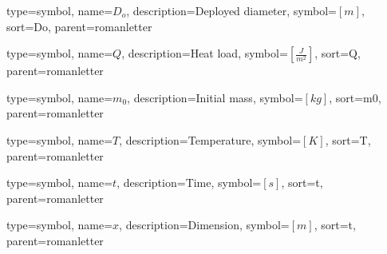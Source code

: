 {
type=symbol, %
name={\ensuremath{D_o}}, %
description={Deployed diameter}, %
symbol={$\left[m \right]$}, %
sort=Do, %
parent=romanletter %
}

{
type=symbol, %
name={\ensuremath{Q}}, %
description={Heat load}, %
symbol={$\left[\frac{J}{m^2} \right]$}, %
sort=Q, %
parent=romanletter %
}

{
type=symbol, %
name={\ensuremath{m_0}}, %
description={Initial mass}, %
symbol={$\left[kg \right]$}, %
sort=m0, %
parent=romanletter %
}


{
	type=symbol, %
	name={\ensuremath{T}}, %
	description={Temperature}, %
	symbol={$\left[K\right]$}, %
	sort=T, %
	parent=romanletter %
}

{
	type=symbol, %
	name={\ensuremath{t}}, %
	description={Time}, %
	symbol={$\left[s\right]$}, %
	sort=t, %
	parent=romanletter %
}

{
	type=symbol, %
	name={\ensuremath{x}}, %
	description={Dimension}, %
	symbol={$\left[m\right]$}, %
	sort=t, %
	parent=romanletter %
}

